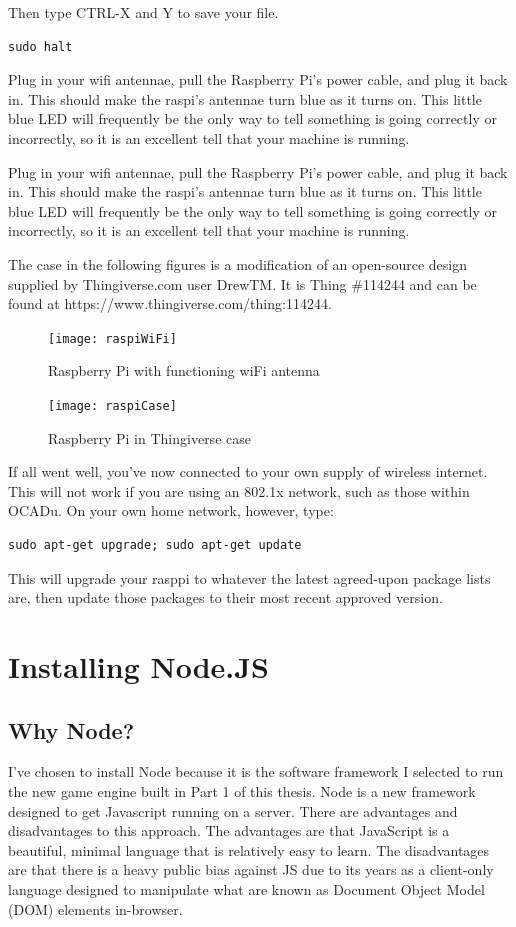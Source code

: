 Then type CTRL-X and Y to save your file.

\begin{lstlisting}
sudo halt
\end{lstlisting}

Plug in your wifi antennae, pull the Raspberry Pi's power cable, and plug it back in. This should make the raspi's antennae turn blue as it turns on. This little blue LED will frequently be the only way to tell something is going correctly or incorrectly, so it is an excellent tell that your machine is running.

Plug in your wifi antennae, pull the Raspberry Pi's power cable, and plug it back in. This should make the raspi's antennae turn blue as it turns on. This little blue LED will frequently be the only way to tell something is going correctly or incorrectly, so it is an excellent tell that your machine is running. 

The case in the following figures is a modification of an open-source design supplied by Thingiverse.com user DrewTM. It is Thing \#114244 and can be found at https://www.thingiverse.com/thing:114244.

\newpage
\begin{figure}[h!]
 \caption{Raspberry Pi with functioning wiFi antenna}
 \centering
  \texttt{[image: raspiWiFi]}
\end{figure}

\begin{figure}[h!]
 \caption{Raspberry Pi in Thingiverse case}
 \centering
  \texttt{[image: raspiCase]}
\end{figure}

\newpage

If all went well, you've now connected to your own supply of wireless internet. This will not work if you are using an 802.1x network, such as those within OCADu. On your own home network, however, type:

\begin{lstlisting}
sudo apt-get upgrade; sudo apt-get update
\end{lstlisting}

This will upgrade your rasppi to whatever the latest agreed-upon package lists are, then update those packages to their most recent approved version.

\section{Installing Node.JS}
\subsection{Why Node?}
I've chosen to install Node because it is the software framework I selected to run the new game engine built in Part 1 of this thesis. Node is a new framework designed to get Javascript running on a server. There are advantages and disadvantages to this approach. The advantages are that JavaScript is a beautiful, minimal language that is relatively easy to learn. The disadvantages are that there is a heavy public bias against JS due to its years as a client-only language designed to manipulate what are known as Document Object Model (DOM) elements in-browser.

